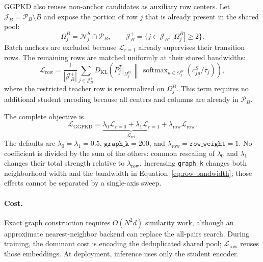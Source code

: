 GGPKD also reuses non-anchor candidates as auxiliary row centers. Let
$\mathcal J_B=\mathcal P_B\setminus B$ and expose the portion of row $j$ that is
already present in the shared pool:
\begin{equation}
\Omega_j^B=\mathcal N_j^S\cap\mathcal P_B,
\qquad
\mathcal J_B^+=\{j\in\mathcal J_B:|\Omega_j^B|\geq2\}.
\end{equation}
Batch anchors are excluded because $\mathcal L_{r=1}$ already supervises their
transition rows. The remaining rows are matched uniformly at their stored
bandwidths:
\begin{equation}
\mathcal L_{\mathrm{row}}
=\frac{1}{|\mathcal J_B^+|}\sum_{j\in\mathcal J_B^+}
D_{\mathrm{KL}}\!\left(
P_j^T\big|_{\Omega_j^B}
\,\middle\|\,
\operatorname{softmax}_{u\in\Omega_j^B}(c_{ju}^S/\tau_j)
\right),
\label{eq:row-loss}
\end{equation}
where the restricted teacher row is renormalized on $\Omega_j^B$. This term
requires no additional student encoding because all centers and columns are
already in $\mathcal P_B$.

The complete objective is
\begin{equation}
\mathcal L_{\mathrm{GGPKD}}
=\underbrace{\lambda_0\mathcal L_{r=0}+\lambda_1\mathcal L_{r=1}}_{\mathcal L_{\mathrm{rel}}}
+\lambda_{\mathrm{row}}\mathcal L_{\mathrm{row}}.
\label{eq:full-objective}
\end{equation}
The defaults are $\lambda_0=\lambda_1=0.5$,
$\texttt{graph\_k}=200$, and
$\lambda_{\mathrm{row}}=\texttt{row\_weight}=1$. No coefficient is divided by
the sum of the others: common rescaling of $\lambda_0$ and $\lambda_1$ changes
their total strength relative to $\lambda_{\mathrm{row}}$. Increasing
\texttt{graph\_k} changes both neighborhood width and the bandwidth in
Equation~\eqref{eq:row-bandwidth}; those effects cannot be separated by a
single-axis sweep.

\paragraph{Cost.}
Exact graph construction requires $O(N^2d)$ similarity work, although an
approximate nearest-neighbor backend can replace the all-pairs search. During
training, the dominant cost is encoding the deduplicated shared pool;
$\mathcal L_{\mathrm{row}}$ reuses those embeddings. At deployment, inference
uses only the student encoder.
